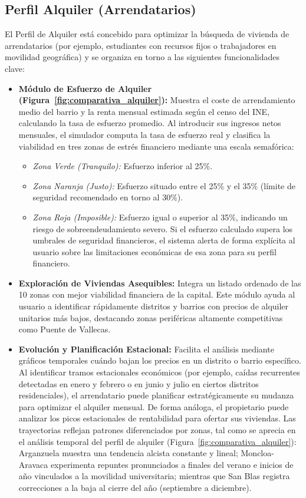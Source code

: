 \documentclass[a4paper,11pt,openany]{book}
\begin{document}
\subsection{Perfil Alquiler (Arrendatarios)}
El Perfil de Alquiler está concebido para optimizar la búsqueda de vivienda de arrendatarios (por ejemplo, estudiantes con recursos fijos o trabajadores en movilidad geográfica) y se organiza en torno a las siguientes funcionalidades clave:
\begin{itemize}
    \item \textbf{Módulo de Esfuerzo de Alquiler (Figura~\ref{fig:comparativa_alquiler}):} Muestra el coste de arrendamiento medio del barrio y la renta mensual estimada según el censo del INE, calculando la tasa de esfuerzo promedio. Al introducir sus ingresos netos mensuales, el simulador computa la tasa de esfuerzo real y clasifica la viabilidad en tres zonas de estrés financiero mediante una escala semafórica:
    \begin{itemize}
        \item \textit{Zona Verde (Tranquilo):} Esfuerzo inferior al 25\%.
        \item \textit{Zona Naranja (Justo):} Esfuerzo situado entre el 25\% y el 35\% (límite de seguridad recomendado en torno al 30\%).
        \item \textit{Zona Roja (Imposible):} Esfuerzo igual o superior al 35\%, indicando un riesgo de sobreendeudamiento severo. Si el esfuerzo calculado supera los umbrales de seguridad financieros, el sistema alerta de forma explícita al usuario sobre las limitaciones económicas de esa zona para su perfil financiero.
    \end{itemize}
    
    \item \textbf{Exploración de Viviendas Asequibles:} Integra un listado ordenado de las 10 zonas con mejor viabilidad financiera de la capital. Este módulo ayuda al usuario a identificar rápidamente distritos y barrios con precios de alquiler unitarios más bajos, destacando zonas periféricas altamente competitivas como Puente de Vallecas.
    
    \item \textbf{Evolución y Planificación Estacional:} Facilita el análisis mediante gráficos temporales cuándo bajan los precios en un distrito o barrio específico. Al identificar tramos estacionales económicos (por ejemplo, caídas recurrentes detectadas en enero y febrero o en junio y julio en ciertos distritos residenciales), el arrendatario puede planificar estratégicamente su mudanza para optimizar el alquiler mensual. De forma análoga, el propietario puede analizar los picos estacionales de rentabilidad para ofertar sus viviendas. Las trayectorias reflejan patrones diferenciados por zonas, tal como se aprecia en el análisis temporal del perfil de alquiler (Figura~\ref{fig:comparativa_alquiler}): Arganzuela muestra una tendencia alcista constante y lineal; Moncloa-Aravaca experimenta repuntes pronunciados a finales del verano e inicios de año vinculados a la movilidad universitaria; mientras que San Blas registra correcciones a la baja al cierre del año (septiembre a diciembre).
    

\end{itemize}
\end{document}
